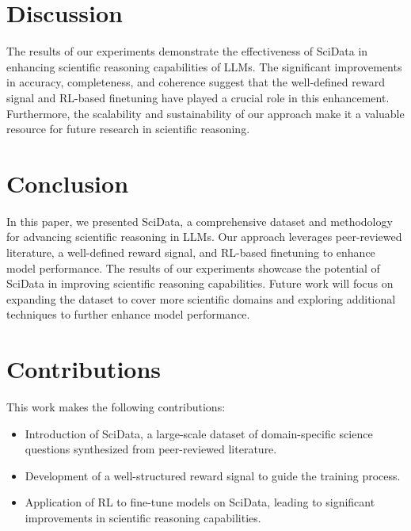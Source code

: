 \documentclass{article}
\begin{document}
\section{Discussion}
The results of our experiments demonstrate the effectiveness of SciData in enhancing scientific reasoning capabilities of LLMs. The significant improvements in accuracy, completeness, and coherence suggest that the well-defined reward signal and RL-based finetuning have played a crucial role in this enhancement. Furthermore, the scalability and sustainability of our approach make it a valuable resource for future research in scientific reasoning.

\section{Conclusion}
In this paper, we presented SciData, a comprehensive dataset and methodology for advancing scientific reasoning in LLMs. Our approach leverages peer-reviewed literature, a well-defined reward signal, and RL-based finetuning to enhance model performance. The results of our experiments showcase the potential of SciData in improving scientific reasoning capabilities. Future work will focus on expanding the dataset to cover more scientific domains and exploring additional techniques to further enhance model performance.

\section{Contributions}
This work makes the following contributions:
\begin{itemize}
    \item Introduction of SciData, a large-scale dataset of domain-specific science questions synthesized from peer-reviewed literature.
    \item Development of a well-structured reward signal to guide the training process.
    \item Application of RL to fine-tune models on SciData, leading to significant improvements in scientific reasoning capabilities.
\end{itemize}
\end{document}
